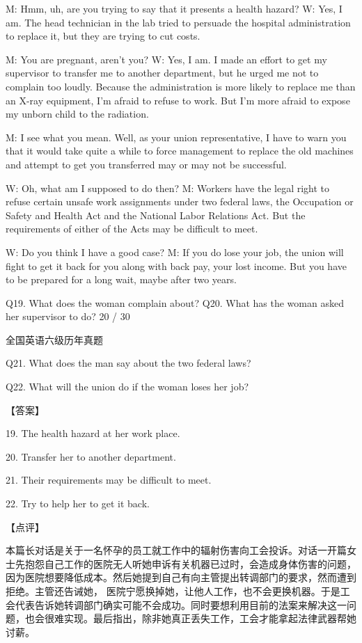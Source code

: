 \documentclass[UTF8,11pt]{ctexart}
\begin{document}
M: Hmm, uh, are you trying to say that it presents a health hazard? W: Yes, I am. The head technician in the lab tried to persuade the hospital administration to replace it, but they are trying to cut costs.


M: You are pregnant, aren’t you? W: Yes, I am. I made an effort to get my supervisor to transfer me to another department, but he urged me not to complain too loudly. Because the administration is more likely to replace me than an X-ray equipment, I’m afraid to refuse to work. But I’m more afraid to expose my unborn child to the radiation.


M: I see what you mean. Well, as your union representative, I have to warn you that it would take quite a while to force management to replace the old machines and attempt to get you transferred may or may not be successful.


W: Oh, what am I supposed to do then? M: Workers have the legal right to refuse certain unsafe work assignments under two federal laws, the Occupation or Safety and Health Act and the National Labor Relations Act. But the requirements of either of the Acts may be difficult to meet.


W: Do you think I have a good case? M: If you do lose your job, the union will fight to get it back for you along with back pay, your lost income. But you have to be prepared for a long wait, maybe after two years.


Q19. What does the woman complain about? Q20. What has the woman asked her supervisor to do? 20 / 30


全国英语六级历年真题


Q21. What does the man say about the two federal laws?


Q22. What will the union do if the woman loses her job?


【答案】


19. The health hazard at her work place.


20. Transfer her to another department.


21. Their requirements may be difficult to meet.


22. Try to help her to get it back.


【点评】


本篇长对话是关于一名怀孕的员工就工作中的辐射伤害向工会投诉。对话一开篇女士先抱怨自己工作的医院无人听她申诉有关机器已过时，会造成身体伤害的问题，因为医院想要降低成本。然后她提到自己有向主管提出转调部门的要求，然而遭到拒绝。主管还告诫她， 医院宁愿换掉她，让他人工作，也不会更换机器。于是工会代表告诉她转调部门确实可能不会成功。同时要想利用目前的法案来解决这一问题，也会很难实现。最后指出，除非她真正丢失工作，工会才能拿起法律武器帮她讨薪。
\end{document}
